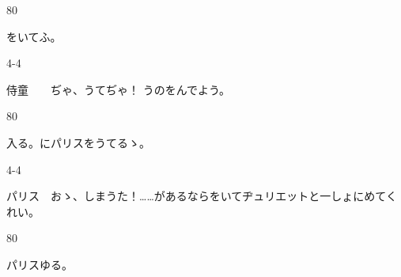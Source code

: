 \documentclass[tate,paper=b6j,jafontsize=9pt]{jlreq}
\begin{document}
\begin{azconvIndented}{8\zw}{0\zw}

をいてふ。

\end{azconvIndented}
\begin{azconvIndented}{4\zw}{-4\zw}

侍童　　ぢゃ、うてぢゃ！ うのをんでよう。

\end{azconvIndented}
\begin{azconvIndented}{8\zw}{0\zw}

入る。にパリスをうてるゝ。

\end{azconvIndented}
\begin{azconvIndented}{4\zw}{-4\zw}

パリス　おゝ、しまうた！……があるならをいてヂュリエットと一しょにめてくれい。

\end{azconvIndented}
\begin{azconvIndented}{8\zw}{0\zw}

パリスゆる。

\end{azconvIndented}
\end{document}

